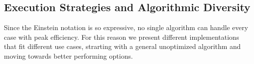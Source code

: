 \documentclass[binding=0.6cm]{sapthesis}
\begin{document}
\subsection{Execution Strategies and Algorithmic Diversity}


Since the Einstein notation is so expressive, no single algorithm can handle every case with peak efficiency. For this reason we present different implementations that fit different use cases, strarting with a general unoptimized algorithm and moving towards better performing options.
\end{document}

